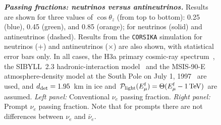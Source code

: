 \documentclass[aps,prd,showpacs,letterpaper,onecolumn,longbibliography,superscriptaddress,notitlepage,nofootinbib]{revtex4-1}%
\newcommand{\Emf}{E_{\mu}^{\rm f}}
\newcommand{\Prob}{{\cal P}}
\newcommand{\CORSIKA}{\texttt{CORSIKA}}
\begin{document}
\begin{figure}
\centering
\caption{\textbf{\textit{Passing fractions: neutrinos versus antineutrinos.}} Results are shown for three values of $\cos\theta_z$ (from top to bottom): 0.25 (blue), 0.45 (green), and 0.85 (orange); for neutrinos (solid) and antineutrinos (dashed). Results from the \CORSIKA{} simulation for neutrinos ($+$) and antineutrinos ($\times$) are also shown, with statistical error bars only. In all cases, the H3a primary cosmic-ray spectrum~\cite{Gaisser:2011cc}, the SIBYLL~2.3 hadronic-interaction model~\cite{Engel:2015dxa, Riehn:2015oba} and the MSIS-90-E atmosphere-density model at the South Pole on July 1, 1997~\cite{Labitzke:1985, Hedin:1991} are used, and $d_{\rm det} = 1.95$~km in ice and $\Prob_{\rm light}(\Emf) = \Theta(\Emf - 1\,{\rm TeV})$ are assumed. \textit{Left panel:} Conventional $\nu_e$ passing fraction. \textit{Right panel:} Prompt $\nu_e$ passing fraction. Note that for prompts there are not differences between $\nu_e$ and $\bar\nu_e$. 
}
\label{fig:nu-e-neutrino-vs-antineutrino}
\end{figure}
\end{document}
